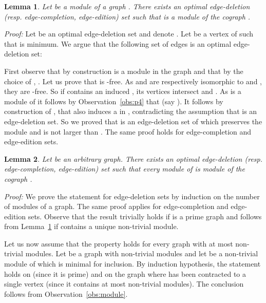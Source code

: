 \documentclass[11pt]{article}
\newenvironment{proof}{\noindent\textit{Proof: }}{{\hfill }}
\newtheorem{lemma}{Lemma}[section]
\begin{document}
\begin{lemma} \label{lem:one-module}
Let   be a module of a graph . There exists an optimal edge-deletion (resp. edge-completion, edge-edition) set  such that  is a module of the cograph .
\end{lemma}

\begin{proof}
Let  be an optimal edge-deletion set  and denote . Let  be a vertex of  such that  is minimum.
We argue that the following set of edges is an optimal edge-deletion set:

First observe that by construction  is a module in the graph  and that by the choice of , . Let us prove that  is -free. As  and  are respectively isomorphic to  and , they are -free. So if  contains an induced , its vertices  intersect  and . As  is a module of  it follows by Observation~\ref{obs:p4} that  (say ). It follows by construction of , that  also induces a  in , contradicting the assumption that  is an edge-deletion set. So we proved that  is an edge-deletion set of  which preserves the module  and is not larger than . 
The same proof holds for edge-completion and edge-edition sets.
\end{proof}

\begin{lemma}
\label{lem:modules}
Let  be an arbitrary graph. There exists an optimal edge-deletion (resp. edge-completion, edge-edition) set  such that every module  of  is module of the cograph .
\end{lemma}

\begin{proof}
We prove the statement for edge-deletion sets by induction on the number of modules of a graph. The same proof applies for edge-completion and edge-edition sets. Observe that the result trivially holds if  is a prime graph and follows from Lemma~\ref{lem:one-module} if  contains a unique non-trivial module.  

Let us now assume that the property holds for every graph with at most  non-trivial modules. Let  be a graph with  non-trivial modules and let  be a non-trivial module of  which is minimal for inclusion. By induction hypothesis, the statement holds on  (since it is prime) and on the graph  where  has been contracted to a single vertex  (since it contains at most  non-trivial modules). The conclusion follows from Observation~\ref{obs:module}.
 \end{proof}\\
\end{document}
